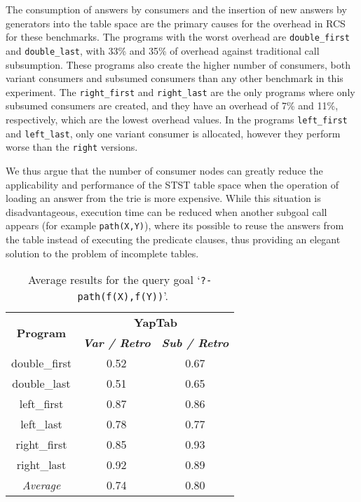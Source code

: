 The consumption of answers by consumers and the insertion of new answers by generators into the table
space are the primary causes for the overhead in RCS for these benchmarks. The programs with the
worst overhead are \texttt{double\_first} and \texttt{double\_last}, with 33\% and 35\% of overhead
against traditional call subsumption. These programs also create the higher number of consumers,
both variant consumers and subsumed consumers than any other benchmark in this experiment.
The \texttt{right\_first} and \texttt{right\_last} are the only programs where only subsumed
consumers are created, and they have an overhead of 7\% and 11\%, respectively, which are the lowest
overhead values. In the programs \texttt{left\_first} and \texttt{left\_last}, only one variant
consumer is allocated, however they perform worse than the \texttt{right} versions.

We thus argue that the number of consumer nodes can greatly reduce the
applicability and performance of the STST table space when the operation of loading an answer
from the trie is more expensive. While this situation is disadvantageous, execution time can
be reduced when another subgoal call appears (for example \texttt{path(X,Y)}), where its possible to
reuse the answers from the table instead of executing the predicate clauses, thus providing an
elegant solution to the problem of incomplete tables.

\begin{table}[ht]
\centering
  \begin{tabular}{ccc}
   \hline
    \hline
    \multirow{2}{*}{\textbf{Program}} & \multicolumn{2}{c}{\textbf{YapTab}} \\
    & \textbf{\textit{\small{Var / Retro}}} & \textbf{\textit{\small{Sub / Retro}}} \\
   \hline
   \hline
double\_first & 0.52 & 0.67 \\
double\_last & 0.51 & 0.65 \\
left\_first & 0.87 & 0.86 \\
left\_last & 0.78 & 0.77 \\
right\_first & 0.85 & 0.93 \\
right\_last & 0.92 & 0.89 \\
\hline
\hline
\textit{Average} & 0.74 &  0.80 \\
\hline
\hline
\end{tabular}
\caption{Average results for the query goal `\texttt{?-~path(f(X),f(Y))}'.}
\label{tbl:results_average_stst}
\end{table}

